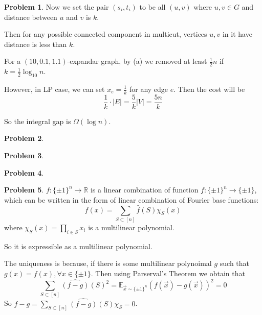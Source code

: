 \documentclass[a4paper]{article}
\theoremstyle{definition}
\newtheorem{problem}{Problem}
\theoremstyle{plain}
\newcommand{\Rbb}{\mathbb R}
\newcommand{\Ebb}{\mathbb E}
\newcommand{\dps}{\displaystyle}
\newcommand{\<}{\left<}
\renewcommand{\>}{\right>}
\numberwithin{equation}{problem}
\begin{document}
\begin{problem}




Now we set the pair  $ (s_i,t_i) $ to be all   $ (u,v) $ where  $ u,v\in G $ and distance between  $ u $ and  $ v $ is  $ k $.

Then for any possible connected component in  multicut, vertices  $ u,v $ in it have  distance  is less than  $ k $.

For a  $ (10,0.1,1.1) $-expandar graph, by (a)  we removed at least  $ \frac{1}{2}n $ if  $ k=\frac{1}{2}\log_{10}n $.

However, in LP case, we can set   $ x_e=\frac{1}{k} $ for any edge  $ e $. Then the cost will be 
\[\frac{1}{k}\cdot |E|=\frac{5}{k}|V|=\frac{5n}{k}\]

So the integral gap is  $ \Omega(\log n) $. 

\end{problem}
\begin{problem}
  
\end{problem}
\begin{problem}
  
\end{problem}
\begin{problem}
  
\end{problem}
\begin{problem}
   $ f:\{\pm 1\}^n\rightarrow \Rbb $ is a linear combination of function  $ f:\{\pm 1\}^n\rightarrow \{\pm 1\} $, which can be written in the form of linear combination of Fourier base functions:
   \[f(x)=\sum_{S\subset [n]}\hat{f}(S)\chi_S(x)\]
   where  $ \dps\chi_S(x)=\prod_{i\in S}x_i $ is a multilinear polynomial.
   
   So it is expressible as a multilinear polynomial.

   The uniqueness is because, if there is some multilinear polynoimal  $ g $ such that  $ g(x)=f(x),\forall x\in\{\pm 1\} $. Then using Parserval's Theorem we obtain that 
   \[\sum_{S\subset [n]}\hat{(f-g)}(S)^2=\Ebb_{\vec{x}\sim\{\pm 1\}^n}(f(\vec{x})-g(\vec{x}))^2=0\]
   So  $ f-g=\dps\sum_{S\subset [n]}\hat{(f-g)}(S)\chi_S=0 $.   
\end{problem}
\end{document}
